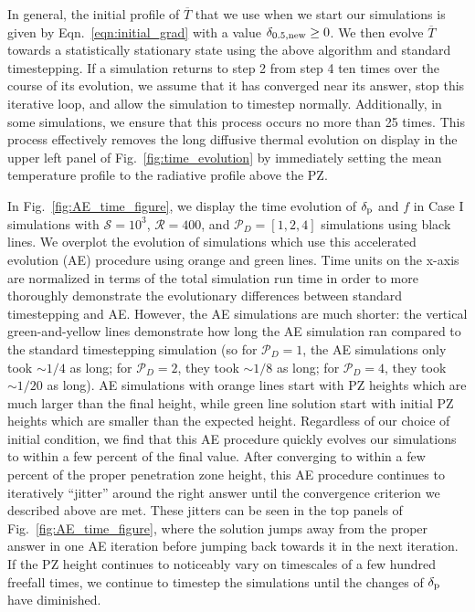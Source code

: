 \documentclass[twocolumn]{aastex631}
\newcommand{\delp}{\ensuremath{\delta_{\rm{p}}}}
\newcommand{\mP}{\ensuremath{\mathcal{P}}}
\newcommand{\mR}{\ensuremath{\mathcal{R}}}
\newcommand{\mS}{\ensuremath{\mathcal{S}}}
\renewcommand{\bar}[1]{\overline{#1}}
\begin{document}
In general, the initial profile of $\bar{T}$ that we use when we start our simulations is given by Eqn.~\ref{eqn:initial_grad} with a value $\delta_{0.5,\rm{new}} \geq 0$.
We then evolve $\bar{T}$ towards a statistically stationary state using the above algorithm and standard timestepping.
If a simulation returns to step 2 from step 4 ten times over the course of its evolution, we assume that it has converged near its answer, stop this iterative loop, and allow the simulation to timestep normally.
Additionally, in some simulations, we ensure that this process occurs no more than 25 times.
This process effectively removes the long diffusive thermal evolution on display in the upper left panel of Fig.~\ref{fig:time_evolution} by immediately setting the mean temperature profile to the radiative profile above the PZ.

In Fig.~\ref{fig:AE_time_figure}, we display the time evolution of $\delp$ and $f$ in Case I simulations with $\mS = 10^3$, $\mR = 400$, and $\mP_D = [1,2,4]$ simulations using black lines.
We overplot the evolution of simulations which use this accelerated evolution (AE) procedure using orange and green lines.
Time units on the x-axis are normalized in terms of the total simulation run time in order to more thoroughly demonstrate the evolutionary differences between standard timestepping and AE.
However, the AE simulations are much shorter: the vertical green-and-yellow lines demonstrate how long the AE simulation ran compared to the standard timestepping simulation (so for $\mP_D = 1$, the AE simulations only took $\sim 1/4$ as long; for $\mP_D = 2$, they took $\sim 1/8$ as long; for $\mP_D = 4$, they took $\sim 1/20$ as long).
AE simulations with orange lines start with PZ heights which are much larger than the final height, while green line solution start with initial PZ heights which are smaller than the expected height.
Regardless of our choice of initial condition, we find that this AE procedure quickly evolves our simulations to within a few percent of the final value.
After converging to within a few percent of the proper penetration zone height, this AE procedure continues to iteratively ``jitter'' around the right answer until the convergence criterion we described above are met.
These jitters can be seen in the top panels of Fig.~\ref{fig:AE_time_figure}, where the solution jumps away from the proper answer in one AE iteration before jumping back towards it in the next iteration.
If the PZ height continues to noticeably vary on timescales of a few hundred freefall times, we continue to timestep the simulations until the changes of $\delp$ have diminished.
\end{document}
